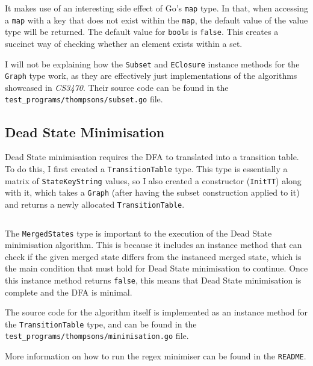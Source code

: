 It makes use of an interesting side effect of Go's \texttt{map} type. In that, when accessing a \texttt{map} with a key that does not exist within the \texttt{map}, the default value of the value type will be returned. The default value for \texttt{bool}s is \texttt{false}. This creates a succinct way of checking whether an element exists within a set.

I will not be explaining how the \verb|Subset| and \verb|EClosure| instance methods for the \verb|Graph| type work, as they are effectively just implementations of the algorithms showcased in \textit{CS3470}. Their source code can be found in the \verb|test_programs/thompsons/subset.go| file.

\subsection{Dead State Minimisation}

Dead State minimisation requires the DFA to translated into a transition table. To do this, I first created a \verb|TransitionTable| type. This type is essentially a matrix of \verb|StateKeyString| values, so I also created a constructor (\verb|InitTT|) along with it, which takes a \verb|Graph| (after having the subset construction applied to it) and returns a newly allocated \verb|TransitionTable|.

\inputminted[firstline=45, lastline=46, autogobble, breaklines, tabsize=4, ]{go}{../../test_programs/thompsons/minimisation.go}

The \verb|MergedStates| type is important to the execution of the Dead State minimisation algorithm. This is because it includes an instance method that can check if the given merged state differs from the instanced merged state, which is the main condition that must hold for Dead State minimisation to continue. Once this instance method returns \texttt{false}, this means that Dead State minimisation is complete and the DFA is minimal.

The source code for the algorithm itself is implemented as an instance method for the \verb|TransitionTable| type, and can be found in the \verb|test_programs/thompsons/minimisation.go| file.

More information on how to run the regex minimiser can be found in the \verb|README|.
